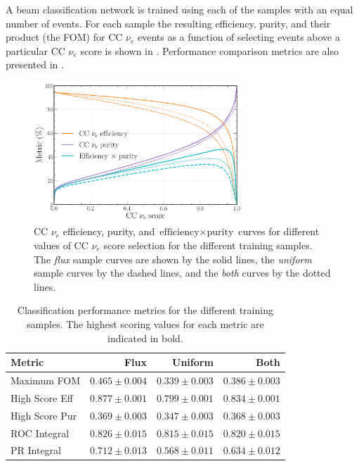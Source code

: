 A beam classification network is trained using each of the samples with an equal number of events.
For each sample the resulting efficiency, purity, and their product (the FOM) for CC $\nu_{e}$
events as a function of selecting events above a particular CC $\nu_{e}$ score is shown in
. Performance comparison metrics are also presented in
.

\begin{figure} %
    \includegraphics[width=0.7\textwidth]{diagrams/7-results/sample_nuel_eff_curves.pdf}
    \caption[CC $\nu_{e}$ efficiency and purity curves for different training samples]
    {CC $\nu_{e}$ efficiency, purity, and $\text{efficiency}\times\text{purity}$ curves for
        different values of CC $\nu_{e}$ score selection for the different training samples. The
        \emph{flux} sample curves are shown by the solid lines, the \emph{uniform} sample curves
        by the dashed lines, and the \emph{both} curves by the dotted lines.}
    \label{fig:sample_nuel_eff_curves}
\end{figure}

\begin{table} %
    \begin{tabular}{lrrr}
        Metric         & Flux           & Uniform & Both  \\
        \midrule
        Maximum FOM    & \textbf{$0.465\pm0.004$} & $0.339\pm0.003$ & $0.386\pm0.003$ \\
        High Score Eff & \textbf{$0.877\pm0.001$} & $0.799\pm0.001$ & $0.834\pm0.001$ \\
        High Score Pur & \textbf{$0.369\pm0.003$} & $0.347\pm0.003$ & $0.368\pm0.003$ \\
        ROC Integral   & \textbf{$0.826\pm0.015$} & $0.815\pm0.015$ & $0.820\pm0.015$ \\
        PR Integral    & \textbf{$0.712\pm0.013$} & $0.568\pm0.011$ & $0.634\pm0.012$ \\
    \end{tabular}
    \caption[Classification performance metrics for different training samples]
    {Classification performance metrics for the different training samples. The highest scoring
        values for each metric are indicated in bold.}
    \label{tab:sample}
\end{table}

